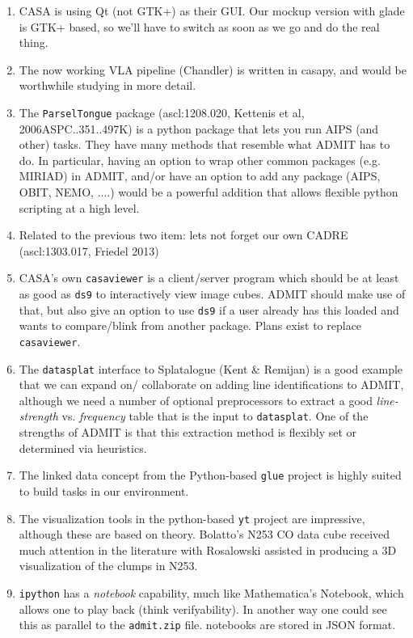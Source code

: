 \documentclass[preprint]{aastex} %
\begin{document}
\begin{enumerate}

\item
CASA is using Qt (not GTK+) as their GUI. Our mockup version with glade is GTK+ based,
so we'll have to switch as soon as we go and do the real thing.

\item
The now working VLA pipeline (Chandler) 
is written in casapy, and would be worthwhile studying in more detail.

\item
The {\tt ParselTongue} package (ascl:1208.020, Kettenis et al, 2006ASPC..351..497K)
is a python package that lets you run AIPS (and other) tasks. 
They have many methods that resemble what ADMIT has to do. In particular, having
an option to wrap other common packages (e.g. MIRIAD) in ADMIT, and/or have an option
to add any package (AIPS, OBIT, NEMO, ....) would be a powerful addition
that allows flexible python scripting at a high level.

\item
Related to the previous two item: lets not forget our own CADRE (ascl:1303.017, Friedel 2013)

\item
CASA's own {\tt casaviewer} is a client/server program which should be at least as good
as {\tt ds9} to interactively view image cubes. ADMIT should make use of that, but also
give an option to use {\tt ds9} if a user already has this loaded and wants to compare/blink  
from another package. Plans exist to replace {\tt casaviewer}.

\item
The {\tt datasplat} interface to Splatalogue (Kent \& Remijan) is 
a good example that we can expand on/ collaborate
on adding line identifications to ADMIT, although we need a number of optional preprocessors
to extract a good {\it line-strength} vs. {\it frequency} table that is the input 
to {\tt datasplat}. One of the strengths of ADMIT is that this extraction method is
flexibly set or determined via heuristics.

\item
The linked data concept from the Python-based 
{\tt glue} project is highly suited to build tasks in our environment.

\item
The visualization tools in the python-based {\tt yt} project are impressive, although
these are based on theory. Bolatto's N253 CO data cube received much attention in the
literature with Rosalowski assisted in producing a 3D visualization of the clumps
in N253.

\item
{\tt ipython} has a {\it notebook} capability, much like Mathematica's Notebook,
which allows one to play back (think verifyability). In another way one could see
this as parallel to the {\tt admit.zip} file. notebooks are stored in JSON
format.


\end{enumerate}
\end{document}
